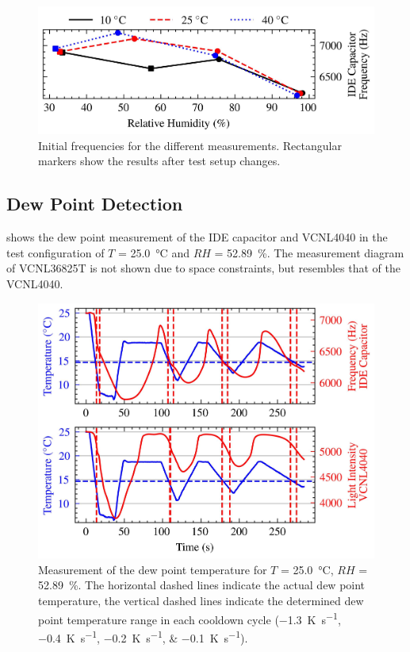 \documentclass[conference,a4paper]{IEEEtran}
\newcommand{\squeezeup}{\vspace{-2mm}}
\begin{document}
\begin{figure}
  \centering
  \includegraphics[width=\columnwidth]{graphs/cap_initial}
  \caption{Initial frequencies for the different measurements. Rectangular markers show the results after test setup changes.}
  \label{g:cap_initial}
\end{figure}

\subsection{Dew Point Detection}

 shows the dew point measurement of the IDE capacitor and VCNL4040 in the test configuration of $T$ = \qty{25.0}{\celsius} and $RH$ = \qty{52.89}{\percent}. The measurement diagram of VCNL36825T is not shown due to space constraints, but resembles that of the VCNL4040. 

\begin{figure}
  \centering
  \includegraphics[width=\columnwidth]{graphs/cap_t25rh50}
  \caption{Measurement of the dew point temperature for $T$ = \qty{25.0}{\celsius}, $RH$ = \qty{52.89}{\percent}. The horizontal dashed lines indicate the actual dew point temperature, the vertical dashed lines indicate the determined dew point temperature range in each cooldown cycle (\qtylist[per-mode=fraction]{-1.3;-0.4; -0.2; -0.1}{\K\per\s}).}
  \label{g:cap_t25rh50}
  \squeezeup
\end{figure}
\end{document}
